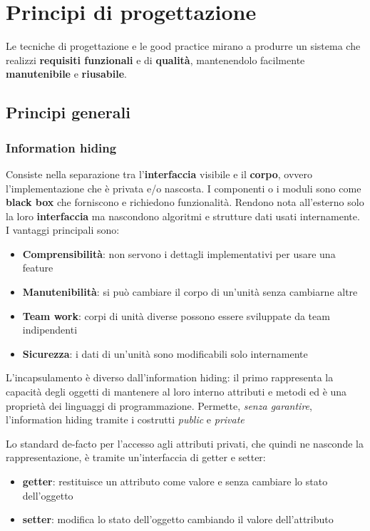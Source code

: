 \newpage
\section{Principi di progettazione}
Le tecniche di progettazione e le good practice mirano a produrre un sistema che realizzi \textbf{requisiti funzionali} e di \textbf{qualità}, mantenendolo facilmente \textbf{manutenibile} e \textbf{riusabile}.
\subsection{Principi generali}
\subsubsection{Information hiding}
Consiste nella separazione tra l'\textbf{interfaccia} visibile e il \textbf{corpo}, ovvero l'implementazione che è privata e/o nascosta. I componenti o i moduli sono come \textbf{black box} che forniscono e richiedono funzionalità. Rendono nota all'esterno solo la loro \textbf{interfaccia} ma nascondono algoritmi e strutture dati usati internamente.\\
I vantaggi principali sono:
\begin{itemize}
	\item \textbf{Comprensibilità}: non servono i dettagli implementativi per usare una feature
	\item \textbf{Manutenibilità}: si può cambiare il corpo di un'unità senza cambiarne altre
	\item \textbf{Team work}: corpi di unità diverse possono essere sviluppate da team indipendenti
	\item \textbf{Sicurezza}: i dati di un'unità sono modificabili solo internamente
\end{itemize}

\begin{observation}[Incapsulamento]
	L'incapsulamento è diverso dall'information hiding: il primo rappresenta la capacità degli oggetti di mantenere al loro interno attributi e metodi ed è una proprietà dei linguaggi di programmazione. Permette, \textit{senza garantire}, l'information hiding tramite i costrutti \textit{public} e \textit{private}
\end{observation}

Lo standard de-facto per l'accesso agli attributi privati, che quindi ne nasconde la rappresentazione, è tramite un'interfaccia di getter e setter:
\begin{itemize}
	\item \textbf{getter}: restituisce un attributo come valore e senza cambiare lo stato dell'oggetto
	\item \textbf{setter}: modifica lo stato dell'oggetto cambiando il valore dell'attributo
\end{itemize}

